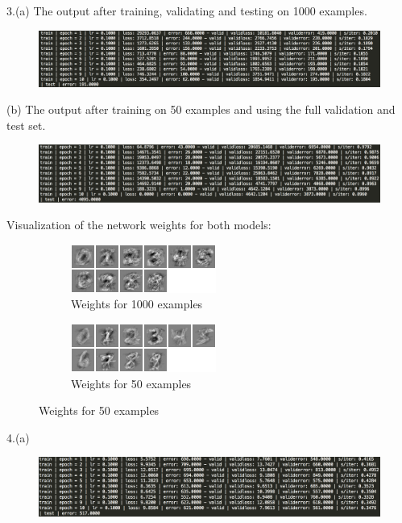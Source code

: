 \documentclass[11pt]{article}
\begin{document}
3.(a) The output after training, validating and testing on 1000 examples.
\begin{figure}[H]
\centering
\includegraphics[scale=0.5]{assign2/torch/output1000.png}
\caption{ \label{fig5}}
\end{figure}
(b) The output after training on 50 examples and using the full validation and test set.
\begin{figure}[H]
\centering
\includegraphics[scale=0.5]{assign2/torch/output50.png}
\caption{ \label{fig6}}
\end{figure}
Visualization of the network weights for both models:
\begin{figure}[H]
\begin{subfigure}{.5\textwidth}
\centering
\includegraphics{assign2/torch/weight_1000.png}
\caption{Weights for 1000 examples\label{fig3}}
\end{subfigure}
\begin{subfigure}{.5\textwidth}
\centering
\includegraphics{assign2/torch/weight_50.png}
\caption{Weights for 50 examples\label{fig4}}
\end{subfigure}
\end{figure}

4.(a)
\begin{figure}[H]
\centering
\includegraphics[scale=0.5]{assign2/torch/outputLRpoint1.png}
\caption{ \label{fig5}}
\end{figure}
\end{document}
